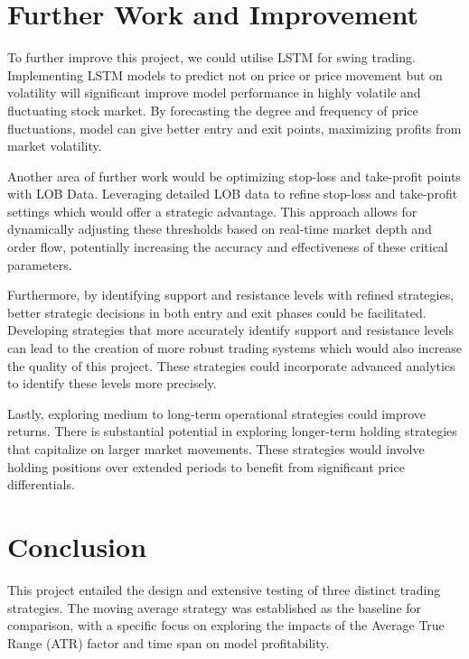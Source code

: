 \documentclass[conference]{IEEEtran}
\begin{document}
\section{Further Work and Improvement}

To further improve this project, we could utilise LSTM for swing trading. Implementing LSTM models to predict not on price or price movement but on volatility will significant improve model performance in highly volatile and fluctuating stock market. By forecasting the degree and frequency of price fluctuations, model can give better entry and exit points, maximizing profits from market volatility.

Another area of further work would be optimizing stop-loss and take-profit points with LOB Data. Leveraging detailed LOB data to refine stop-loss and take-profit settings which would offer a strategic advantage. This approach allows for dynamically adjusting these thresholds based on real-time market depth and order flow, potentially increasing the accuracy and effectiveness of these critical parameters.

Furthermore, by identifying support and resistance levels with refined strategies, better strategic decisions in both entry and exit phases could be facilitated. Developing strategies that more accurately identify support and resistance levels can lead to the creation of more robust trading systems which would also increase the quality of this project. These strategies could incorporate advanced analytics to identify these levels more precisely.

Lastly, exploring medium to long-term operational strategies could improve returns. There is substantial potential in exploring longer-term holding strategies that capitalize on larger market movements. These strategies would involve holding positions over extended periods to benefit from significant price differentials.







\section{Conclusion}
This project entailed the design and extensive testing of three distinct trading strategies. The moving average strategy was established as the baseline for comparison, with a specific focus on exploring the impacts of the Average True Range (ATR) factor and time span on model profitability.
\end{document}
